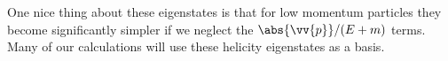 \documentclass[fleqn]{NotesClass}
\begin{document}
    One nice thing about these eigenstates is that for low momentum particles they become significantly simpler if we neglect the \(\abs{\vv{p}}/(E + m)\) terms.
    Many of our calculations will use these helicity eigenstates as a basis.
    
    \appendixpage
    \begin{appendices}
        
        
    \end{appendices}
    
    \backmatter
    \renewcommand{\glossaryname}{Acronyms}
    \printglossary[acronym]
    \printindex
\end{document}
